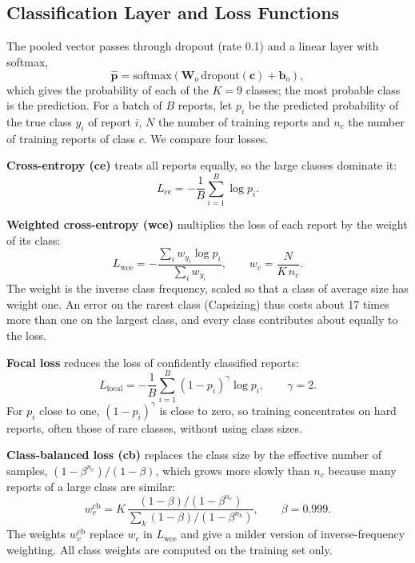 \documentclass[conference]{IEEEtran}
\begin{document}
\subsection{Classification Layer and Loss Functions}\label{sec:loss}

The pooled vector passes through dropout (rate 0.1) and a linear layer with softmax,
\begin{equation}
  \hat{\mathbf{p}} = \mathrm{softmax}(\mathbf{W}_o\, \mathrm{dropout}(\mathbf{c}) + \mathbf{b}_o),
\end{equation}
which gives the probability of each of the $K = 9$ classes; the most probable class is the prediction. For a batch of $B$ reports, let $p_i$ be the predicted probability of the true class $y_i$ of report $i$, $N$ the number of training reports and $n_c$ the number of training reports of class $c$. We compare four losses.

\textbf{Cross-entropy (ce)} treats all reports equally, so the large classes dominate it:
\begin{equation}
  L_{\mathrm{ce}} = -\frac{1}{B}\sum_{i=1}^{B} \log p_i .
\end{equation}

\textbf{Weighted cross-entropy (wce)} multiplies the loss of each report by the weight of its class:
\begin{equation}
  L_{\mathrm{wce}} = -\frac{\sum_i w_{y_i} \log p_i}{\sum_i w_{y_i}}, \qquad w_c = \frac{N}{K\, n_c}.
\end{equation}
The weight is the inverse class frequency, scaled so that a class of average size has weight one. An error on the rarest class (Capsizing) thus costs about 17 times more than one on the largest class, and every class contributes about equally to the loss.

\textbf{Focal loss} \cite{lin2020focal} reduces the loss of confidently classified reports:
\begin{equation}
  L_{\mathrm{focal}} = -\frac{1}{B}\sum_{i=1}^{B} (1-p_i)^{\gamma} \log p_i, \qquad \gamma = 2.
\end{equation}
For $p_i$ close to one, $(1-p_i)^{\gamma}$ is close to zero, so training concentrates on hard reports, often those of rare classes, without using class sizes.

\textbf{Class-balanced loss (cb)} \cite{zhang2023longtailed} replaces the class size by the effective number of samples, $(1-\beta^{n_c})/(1-\beta)$, which grows more slowly than $n_c$ because many reports of a large class are similar:
\begin{equation}
  w^{\mathrm{cb}}_c = K\,\frac{(1-\beta)/(1-\beta^{n_c})}{\sum_{k} (1-\beta)/(1-\beta^{n_k})}, \qquad \beta = 0.999.
\end{equation}
The weights $w^{\mathrm{cb}}_c$ replace $w_c$ in $L_{\mathrm{wce}}$ and give a milder version of inverse-frequency weighting. All class weights are computed on the training set only.
\end{document}
